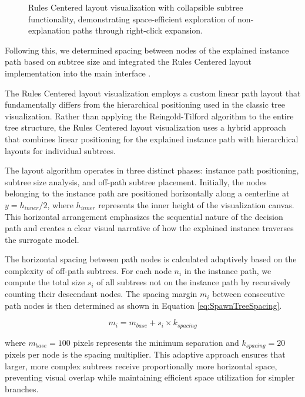\begin{figure}
    \caption{Rules Centered layout visualization with collapsible subtree functionality, demonstrating space-efficient exploration of non-explanation paths through right-click expansion.}
\end{figure}

Following this, we determined spacing between nodes of the explained instance path based on subtree size \cite{git31commit} and integrated the Rules Centered layout implementation into the main interface \cite{git32commit}.

The Rules Centered layout visualization employs a custom linear path layout that fundamentally differs from the hierarchical positioning used in the classic tree visualization. Rather than applying the Reingold-Tilford algorithm to the entire tree structure, the Rules Centered layout visualization uses a hybrid approach that combines linear positioning for the explained instance path with hierarchical layouts for individual subtrees.

The layout algorithm operates in three distinct phases: instance path positioning, subtree size analysis, and off-path subtree placement. Initially, the nodes belonging to the instance path are positioned horizontally along a centerline at $y = h_{inner}/2$, where $h_{inner}$ represents the inner height of the visualization canvas. This horizontal arrangement emphasizes the sequential nature of the decision path and creates a clear visual narrative of how the explained instance traverses the surrogate model.

The horizontal spacing between path nodes is calculated adaptively based on the complexity of off-path subtrees. For each node $n_i$ in the instance path, we compute the total size $s_i$ of all subtrees not on the instance path by recursively counting their descendant nodes. The spacing margin $m_i$ between consecutive path nodes is then determined as shown in Equation \ref{eq:SpawnTreeSpacing}.

\begin{equation}
m_i = m_{base} + s_i \times k_{spacing}
\label{eq:SpawnTreeSpacing}
\end{equation}

where $m_{base} = 100$ pixels represents the minimum separation and $k_{spacing} = 20$ pixels per node is the spacing multiplier. This adaptive approach ensures that larger, more complex subtrees receive proportionally more horizontal space, preventing visual overlap while maintaining efficient space utilization for simpler branches.

